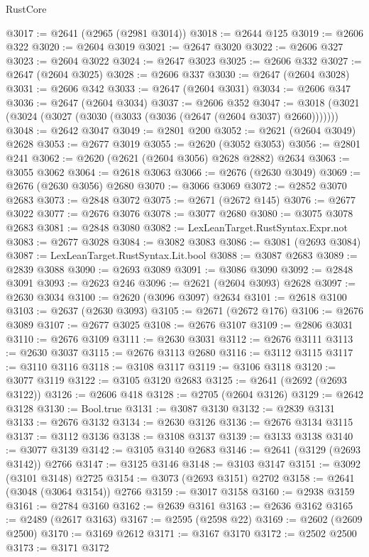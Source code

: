 \begin{lexlean}{RustCore}
\begin{coremodule}
@3017 := @2641 (@2965 (@2981 @3014))
@3018 := @2644 @125
@3019 := @2606 @322
@3020 := @2604 @3019
@3021 := @2647 @3020
@3022 := @2606 @327
@3023 := @2604 @3022
@3024 := @2647 @3023
@3025 := @2606 @332
@3027 := @2647 (@2604 @3025)
@3028 := @2606 @337
@3030 := @2647 (@2604 @3028)
@3031 := @2606 @342
@3033 := @2647 (@2604 @3031)
@3034 := @2606 @347
@3036 := @2647 (@2604 @3034)
@3037 := @2606 @352
@3047 := @3018 (@3021 (@3024 (@3027 (@3030 (@3033 (@3036 (@2647 (@2604 @3037) @2660)))))))
@3048 := @2642 @3047
@3049 := @2801 @200
@3052 := @2621 (@2604 @3049) @2628
@3053 := @2677 @3019
@3055 := @2620 (@3052 @3053)
@3056 := @2801 @241
@3062 := @2620 (@2621 (@2604 @3056) @2628 @2882) @2634
@3063 := @3055 @3062
@3064 := @2618 @3063
@3066 := @2676 (@2630 @3049)
@3069 := @2676 (@2630 @3056) @2680
@3070 := @3066 @3069
@3072 := @2852 @3070 @2683
@3073 := @2848 @3072
@3075 := @2671 (@2672 @145)
@3076 := @2677 @3022
@3077 := @2676 @3076
@3078 := @3077 @2680
@3080 := @3075 @3078 @2683
@3081 := @2848 @3080
@3082 := LexLeanTarget.RustSyntax.Expr.not
@3083 := @2677 @3028
@3084 := @3082 @3083
@3086 := @3081 (@2693 @3084)
@3087 := LexLeanTarget.RustSyntax.Lit.bool
@3088 := @3087 @2683
@3089 := @2839 @3088
@3090 := @2693 @3089
@3091 := @3086 @3090
@3092 := @2848 @3091
@3093 := @2623 @246
@3096 := @2621 (@2604 @3093) @2628
@3097 := @2630 @3034
@3100 := @2620 (@3096 @3097) @2634
@3101 := @2618 @3100
@3103 := @2637 (@2630 @3093)
@3105 := @2671 (@2672 @176)
@3106 := @2676 @3089
@3107 := @2677 @3025
@3108 := @2676 @3107
@3109 := @2806 @3031
@3110 := @2676 @3109
@3111 := @2630 @3031
@3112 := @2676 @3111
@3113 := @2630 @3037
@3115 := @2676 @3113 @2680
@3116 := @3112 @3115
@3117 := @3110 @3116
@3118 := @3108 @3117
@3119 := @3106 @3118
@3120 := @3077 @3119
@3122 := @3105 @3120 @2683
@3125 := @2641 (@2692 (@2693 @3122))
@3126 := @2606 @418
@3128 := @2705 (@2604 @3126)
@3129 := @2642 @3128
@3130 := Bool.true
@3131 := @3087 @3130
@3132 := @2839 @3131
@3133 := @2676 @3132
@3134 := @2630 @3126
@3136 := @2676 @3134 @3115
@3137 := @3112 @3136
@3138 := @3108 @3137
@3139 := @3133 @3138
@3140 := @3077 @3139
@3142 := @3105 @3140 @2683
@3146 := @2641 (@3129 (@2693 @3142)) @2766
@3147 := @3125 @3146
@3148 := @3103 @3147
@3151 := @3092 (@3101 @3148) @2725
@3154 := @3073 (@2693 @3151) @2702
@3158 := @2641 (@3048 (@3064 @3154)) @2766
@3159 := @3017 @3158
@3160 := @2938 @3159
@3161 := @2784 @3160
@3162 := @2639 @3161
@3163 := @2636 @3162
@3165 := @2489 (@2617 @3163)
@3167 := @2595 (@2598 @22)
@3169 := @2602 (@2609 @2500)
@3170 := @3169 @2612
@3171 := @3167 @3170
@3172 := @2502 @2500
@3173 := @3171 @3172

\end{coremodule}
\end{lexlean}
